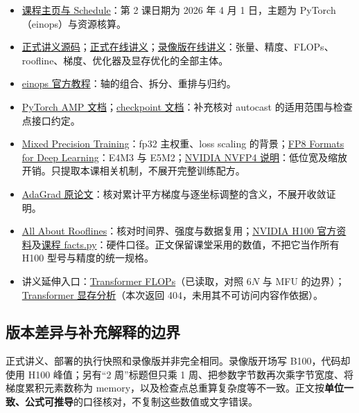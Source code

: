 \documentclass[UTF8,fontset=fandol,zihao=-4,a4paper]{ctexart}
\begin{document}
\begin{itemize}[itemsep=0.25em]
\item \href{https://cs336.stanford.edu/}{课程主页与 Schedule}：第 2 课日期为 2026 年 4 月 1 日，主题为 PyTorch（einops）与资源核算。
\item \href{https://github.com/stanford-cs336/lectures/blob/main/lecture_02.py}{正式讲义源码}；\href{https://cs336.stanford.edu/lectures/?trace=lecture_02}{正式在线讲义}；\href{https://cs336.stanford.edu/lectures/?trace=lecture_02_recording}{录像版在线讲义}：张量、精度、FLOPs、roofline、梯度、优化器及显存优化的全部主体。
\item \href{https://einops.rocks/1-einops-basics/}{einops 官方教程}：轴的组合、拆分、重排与归约。
\item \href{https://docs.pytorch.org/docs/stable/amp.html}{PyTorch AMP 文档}；\href{https://docs.pytorch.org/docs/stable/checkpoint.html}{checkpoint 文档}：补充核对 autocast 的适用范围与检查点接口约定。
\item \href{https://arxiv.org/abs/1710.03740}{Mixed Precision Training}：fp32 主权重、loss scaling 的背景；\href{https://arxiv.org/abs/2209.05433}{FP8 Formats for Deep Learning}：E4M3 与 E5M2；\href{https://developer.nvidia.com/blog/introducing-nvfp4-for-efficient-and-accurate-low-precision-inference/}{NVIDIA NVFP4 说明}：低位宽及缩放开销。只提取本课相关机制，不展开完整训练配方。
\item \href{https://www.jmlr.org/papers/volume12/duchi11a/duchi11a.pdf}{AdaGrad 原论文}：核对累计平方梯度与逐坐标调整的含义，不展开收敛证明。
\item \href{https://jax-ml.github.io/scaling-book/roofline/}{All About Rooflines}：核对时间界、强度与数据复用；\href{https://www.nvidia.com/en-us/data-center/h100/}{NVIDIA H100 官方资料}及\href{https://github.com/stanford-cs336/lectures/blob/main/facts.py}{课程 facts.py}：硬件口径。正文保留课堂采用的数值，不把它当作所有 H100 型号与精度的统一规格。
\item 讲义延伸入口：\href{https://www.adamcasson.com/posts/transformer-flops}{Transformer FLOPs}（已读取，对照 $6N$ 与 MFU 的边界）；\href{https://erees.dev/transformer-memory/}{Transformer 显存分析}（本次返回 404，未用其不可访问内容作依据）。
\end{itemize}

\subsection{版本差异与补充解释的边界}
正式讲义、部署的执行快照和录像版并非完全相同。录像版开场写 B100，代码却使用 H100 峰值；另有“2 周”标题但只乘 1 周、把参数字节数再次乘字节宽度、将梯度累积元素数称为 memory，以及检查点总重算复杂度等不一致。正文按\textbf{单位一致、公式可推导}的口径核对，不复制这些数值或文字错误。
\end{document}
